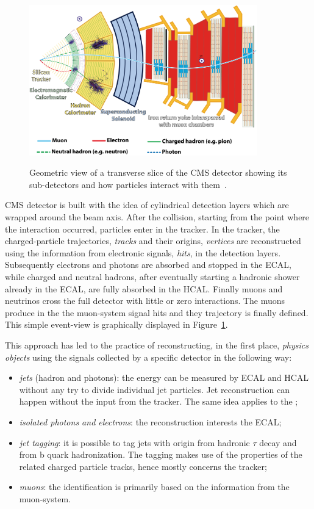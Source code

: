 \begin{figure}[h]
\centering
\includegraphics[width=0.88\textwidth]{Figures/c2/CMSslice.png}\\
\caption{Geometric view of a transverse slice of the CMS detector showing its sub-detectors and how particles interact with them~\cite{Barney:2120661}.}
\label{fig:cmsslice}
\end{figure} 
CMS detector is built with the idea of cylindrical detection layers
which are wrapped around the beam axis. After the collision, starting
from the point where the interaction occurred, particles enter in the
tracker. In the tracker, the charged-particle trajectories, \emph{tracks}
and their origins, \emph{vertices} are reconstructed using the information from
electronic signals, \emph{hits}, in the detection layers. Subsequently
electrons and photons are absorbed and stopped in the ECAL, while
charged and neutral hadrons, after eventually starting a hadronic
shower already in the ECAL, are fully absorbed in the HCAL. Finally muons and neutrinos cross
the full detector with little or zero interactions. The muons 
produce in the the muon-system signal hits and they trajectory is finally defined. This simple
event-view is graphically displayed in Figure~\ref{fig:cmsslice}.


This approach has led to the practice of reconstructing, in the first place, \emph{physics
objects} using the signals collected by a specific
detector in the following way:
\begin{itemize}
\setlength\itemsep{-0.2em}
\item \emph{jets} (hadron and photons): the energy can be measured by ECAL
  and HCAL without any try to divide individual jet particles. Jet
  reconstruction can happen without the input from the tracker. The
  same idea applies to the \ptmiss;
\item \emph{isolated photons and electrons}: the reconstruction interests the
  ECAL;
\item \emph{jet tagging}: it is possible to tag jets with origin from hadronic $\tau$ decay and
  from b quark hadronization. The tagging makes use of the properties of
  the related charged particle tracks, hence mostly concerns the
  tracker;
\item \emph{muons}: the identification is primarily based on the information
  from the muon-system.
\end{itemize}

